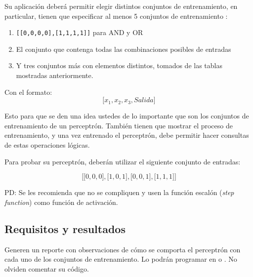 Su aplicación deberá permitir elegir distintos conjuntos de entrenamiento, en particular, tienen que especificar al menos 5 conjuntos de entrenamiento : 

\begin{enumerate}
  \item \texttt{[[0,0,0,0],[1,1,1,1]]} para AND y OR
  \item El conjunto que contenga todas las combinaciones posibles de entradas
  \item Y tres conjuntos más con elementos distintos, tomados de las tablas mostradas anteriormente.
\end{enumerate}

Con el formato: \[\texttt{[}x_1, x_2, x_3, Salida\texttt{]} \]

\noindent Esto para que se den una idea ustedes de lo importante que son los conjuntos de entrenamiento de un perceptrón.
También tienen que mostrar el proceso de entrenamiento, y una vez entrenado el perceptrón, debe permitir hacer consultas de estas operaciones lógicas.\par
Para probar su perceptrón, deberán utilizar el siguiente conjunto de entradas:

\[\texttt{[}\texttt{[}0,0,0\texttt{]}, \texttt{[}1,0,1\texttt{]}, \texttt{[}0,0,1\texttt{]}, \texttt{[}1,1,1\texttt{]} \texttt{]}\]

\noindent PD: Se les recomienda que no se compliquen y usen la función escalón (\textit{step function}) como función de activación.\par


\subsection{Requisitos y resultados}

Generen un reporte con observaciones de cómo se comporta el perceptrón con cada uno de los conjuntos de entrenamiento. Lo podrán programar en  o . No olviden comentar su código.\medskip





